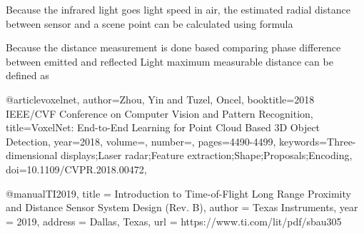 Because the infrared light goes light speed  in air, the estimated radial distance between
sensor and a scene point can be calculated using formula

Because the distance measurement is done based comparing phase difference between emitted and reflected Light
maximum measurable distance can be defined as




@article{voxelnet,
  author={Zhou, Yin and Tuzel, Oncel},
  booktitle={2018 IEEE/CVF Conference on Computer Vision and Pattern Recognition}, 
  title={VoxelNet: End-to-End Learning for Point Cloud Based 3D Object Detection}, 
  year={2018},
  volume={},
  number={},
  pages={4490-4499},
  keywords={Three-dimensional displays;Laser radar;Feature extraction;Shape;Proposals;Encoding},
  doi={10.1109/CVPR.2018.00472},
  }

  @manual{TI2019,
    title = {Introduction to Time-of-Flight Long Range Proximity and Distance Sensor System Design (Rev. B)},
    author = {Texas Instruments},
    year = {2019},
    address = {Dallas, Texas},
    url = {https://www.ti.com/lit/pdf/sbau305}
}

